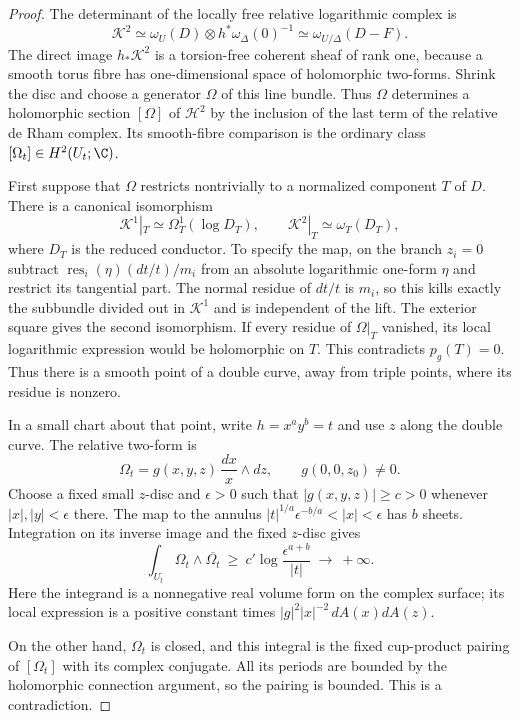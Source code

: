\begin{proof}
The determinant of the locally free relative logarithmic complex is
\[
\mathscr K^2\simeq
 \omega_U(D)\otimes h^*\omega_\Delta(0)^{-1}
 \simeq\omega_{U/\Delta}(D-F).
\]
The direct image $h_*\mathscr K^2$ is a torsion-free
coherent sheaf of rank one, because a smooth torus fibre has
one-dimensional space of holomorphic two-forms. Shrink the disc
and choose a generator $\Omega$ of this line bundle.
Thus $\Omega$ determines a holomorphic section $[\Omega]$ of
$\mathscr H^2$ by the inclusion of the last term of the
relative de Rham complex. Its smooth-fibre comparison is the
ordinary class $[\Omega_t]\in H^2(U_t;\C)$.

First suppose that $\Omega$ restricts nontrivially to a normalized
component $T$ of $D$. There is a canonical isomorphism
\[
 \mathscr K^1|_T\simeq\Omega_T^1(\log D_T),\qquad
 \mathscr K^2|_T\simeq\omega_T(D_T),
\]
where $D_T$ is the reduced conductor. To specify the map, on the
branch $z_i=0$ subtract
$\operatorname{res}_i(\eta)(dt/t)/m_i$ from an absolute logarithmic
one-form $\eta$ and restrict its tangential part. The normal
residue of $dt/t$ is $m_i$, so this kills exactly the subbundle
divided out in $\mathscr K^1$ and is independent of the lift.
The exterior square gives the second isomorphism. If every
residue of $\Omega|_T$ vanished, its local logarithmic expression
would be holomorphic on $T$. This contradicts $p_g(T)=0$.
Thus there is a smooth point of a double curve, away from triple
points, where its residue is nonzero.

In a small chart about that point, write $h=x^ay^b=t$ and use $z$
along the double curve. The relative two-form is
\[
 \Omega_t=g(x,y,z)\,\frac{dx}{x}\wedge dz,
 \qquad g(0,0,z_0)\ne0.
\]
Choose a fixed small $z$-disc and $\epsilon>0$ such that
$|g(x,y,z)|\ge c>0$ whenever $|x|,|y|<\epsilon$ there.
The map to the annulus
$|t|^{1/a}\epsilon^{-b/a}<|x|<\epsilon$
has $b$ sheets. Integration on its inverse image and the fixed
$z$-disc gives
\[
 \int_{U_t}\Omega_t\wedge\overline{\Omega_t}
 \ \ge\ c'\log\frac{\epsilon^{a+b}}{|t|}
 \ \longrightarrow\ +\infty.
\]
Here the integrand is a nonnegative real volume form on the
complex surface; its local expression is a positive constant
times $|g|^2|x|^{-2}\,dA(x)dA(z)$.

On the other hand, $\Omega_t$ is closed, and this integral is
the fixed cup-product pairing of $[\Omega_t]$ with its complex
conjugate. All its periods are bounded by the holomorphic
connection argument, so the pairing is bounded. This is a
contradiction.


\end{proof}
